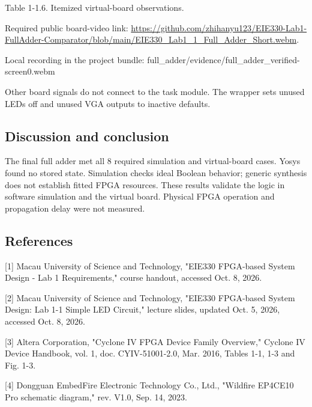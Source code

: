 \documentclass[10pt,a4paper]{article}
\begin{document}
{\small\raggedright Table 1-1.6. Itemized virtual-board observations.\par}

{\small\raggedright Required public board-video link: \url{https://github.com/zhihanyu123/EIE330-Lab1-FullAdder-Comparator/blob/main/EIE330_Lab1_1_Full_Adder_Short.webm}.\par}

{\small\raggedright Local recording in the project bundle: full\_adder/evidence/full\_adder\_verified-screen0.webm\par}

{\small\raggedright Other board signals do not connect to the task module. The wrapper sets unused LEDs off and unused VGA outputs to inactive defaults.\par}

\subsection*{Discussion and conclusion}

{\small\raggedright The final full adder met all 8 required simulation and virtual-board cases. Yosys found no stored state. Simulation checks ideal Boolean behavior; generic synthesis does not establish fitted FPGA resources. These results validate the logic in software simulation and the virtual board. Physical FPGA operation and propagation delay were not measured.\par}

\subsection*{References}

{\small\raggedright [1] Macau University of Science and Technology, "EIE330 FPGA-based System Design - Lab 1 Requirements," course handout, accessed Oct. 8, 2026.\par}

{\small\raggedright [2] Macau University of Science and Technology, "EIE330 FPGA-based System Design: Lab 1-1 Simple LED Circuit," lecture slides, updated Oct. 5, 2026, accessed Oct. 8, 2026.\par}

{\small\raggedright [3] Altera Corporation, "Cyclone IV FPGA Device Family Overview," Cyclone IV Device Handbook, vol. 1, doc. CYIV-51001-2.0, Mar. 2016, Tables 1-1, 1-3 and Fig. 1-3.\par}

{\small\raggedright [4] Dongguan EmbedFire Electronic Technology Co., Ltd., "Wildfire EP4CE10 Pro schematic diagram," rev. V1.0, Sep. 14, 2023.\par}
\end{document}
